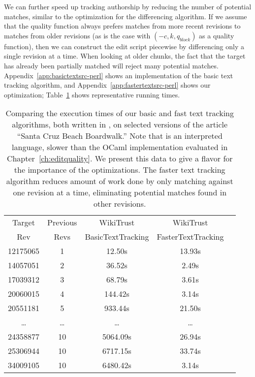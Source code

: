 We can further speed up tracking authorship by reducing the number
of potential matches, similar to the optimization for the differencing
algorithm.
If we assume that the quality function always prefers matches from
more recent revisions to matches from older revisions
(as is the case with $(-c, k, q_{block})$ as a quality function),
then we can construct the edit script piecewise by differencing
only a single revision at a time.
When looking at older chunks, the fact that the target has already
been partially matched will reject many potential matches.
Appendix~\ref{app:basictextsrc-perl} shows an implementation of the
basic text tracking algorithm, and Appendix~\ref{app:fastertextsrc-perl}
shows our optimization; Table~\ref{tab:comparetext} shows representative
running times.

\begin{table}
\begin{center}
\begin{tabular}{| c | c || c || c | c |}
\hline
Target & Previous & WikiTrust & WikiTrust \\
Rev & Revs & BasicTextTracking & FasterTextTracking \\
\hline
12175065 & 1 & 12.50s & 13.93s \\
14057051 & 2 & 36.52s & 2.49s \\
17039312 & 3 & 68.79s & 3.61s \\
20060015 & 4 & 144.42s & 3.14s \\
20551181 & 5 & 933.44s & 21.50s \\
\ldots & \ldots & \ldots & \ldots \\
24358877 & 10 & 5064.09s & 26.94s \\
25306944 & 10 & 6717.15s & 33.74s \\
34009105 & 10 & 6480.42s & 3.14s \\
\hline
\end{tabular}
\end{center}
\caption[Comparing execution times of our basic and
    faster text tracking algorithms.]{
    Comparing the execution times of our
    basic and fast text tracking
    algorithms, both written in \perl, on selected versions of the article
    ``Santa Cruz Beach Boardwalk.''
    Note that \perl is an interpreted language, slower than the
    OCaml implementation evaluated in Chapter~\ref{ch:editquality}.
    We present this data to give a flavor for the importance
    of the optimizations.
    The faster text tracking algorithm reduces amount of work
    done by only matching against one revision at a time, eliminating
    potential matches found in other revisions.
}
\label{tab:comparetext}
\end{table}


